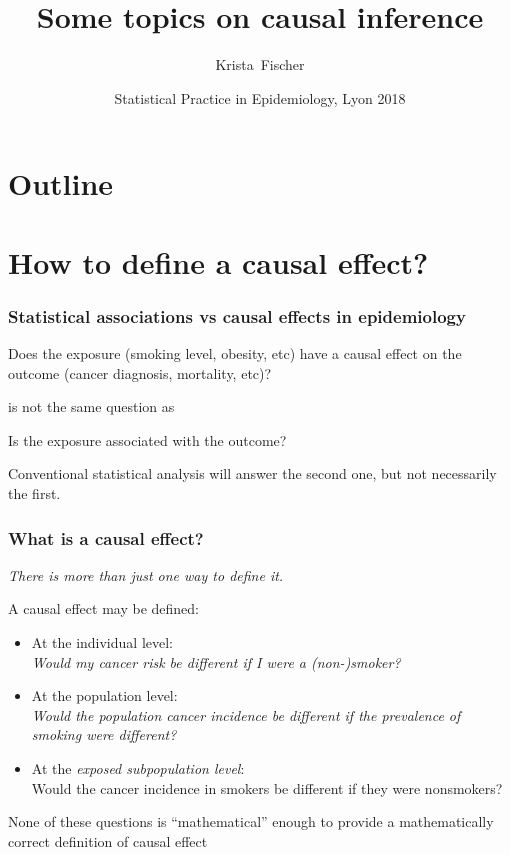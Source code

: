 \documentclass{beamer}
\title{Some topics on causal inference}
\author{Krista~Fischer}
\institute[TY] %
{
   Estonian Genome Center, University of Tartu, Estonia
}
\date[Lyon 2018] %
{Statistical Practice in Epidemiology, Lyon 2018}
\begin{document}
\begin{frame}
  \titlepage
\end{frame}

\section*{Outline}
\begin{frame}
\tableofcontents
\end{frame}

\section{How to define a causal effect?}

\begin{frame}
  \frametitle{Statistical associations vs causal effects in epidemiology}
  \begin{block}{}
  Does the exposure (smoking level, obesity, etc) have a \alert<2>{causal effect} on the outcome (cancer diagnosis, mortality, etc)?
  \end{block}
is not the same question as   
 \begin{block}{}
  Is the exposure \alert<3>{associated} with the outcome?
  \end{block}
 Conventional statistical analysis will answer the second one, but not necessarily the first. 
\end{frame}

\begin{frame}
  \frametitle{What is a causal effect?}
  
 \emph{There is more than just one way to define it.}
 
 A causal effect may be defined:
  \begin{itemize}
  \item At the \alert<1>{individual level}: \\
  \alert<1>{\textit{Would my cancer risk be different if I were a (non-)smoker?}}
  \item At the \alert<2>{population level}: \\
  \alert<2>{\textit{Would the population cancer incidence be different if the prevalence of smoking were different?}}
  \item At the \alert<3>{\textit{exposed subpopulation level}}: \\
  \alert<3>{Would the cancer incidence in smokers be different if they were nonsmokers?}
  \end{itemize}
\alert<4>{
None of these questions is ``mathematical'' enough to provide a mathematically correct definition of causal effect 
}
\end{frame}
\end{document}
